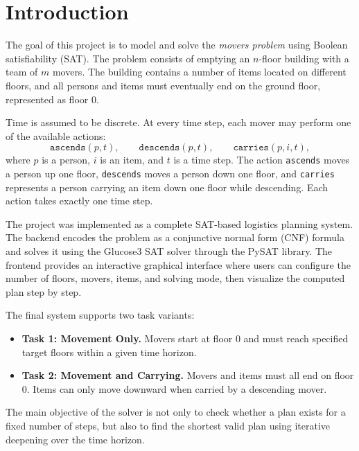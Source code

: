 \section{Introduction} \label{sec:introduction}
The goal of this project is to model and solve the \textit{movers problem} using Boolean satisfiability (SAT).
The problem consists of emptying an $n$-floor building with a team of $m$ movers.
The building contains a number of items located on different floors, and all persons and items must eventually end on the ground floor, represented as floor $0$.

\noindent Time is assumed to be discrete.
At every time step, each mover may perform one of the available actions:
\[
    \texttt{ascends}(p,t), \qquad
    \texttt{descends}(p,t), \qquad
    \texttt{carries}(p,i,t),
\]
where $p$ is a person, $i$ is an item, and $t$ is a time step.
The action \texttt{ascends} moves a person up one floor, \texttt{descends} moves a person down one floor, and \texttt{carries} represents a person carrying an item down one floor while descending.
Each action takes exactly one time step.

\noindent The project was implemented as a complete SAT-based logistics planning system.
The backend encodes the problem as a conjunctive normal form (CNF) formula and solves it using the Glucose3 SAT solver through the PySAT library.
The frontend provides an interactive graphical interface where users can configure the number of floors, movers, items, and solving mode, then visualize the computed plan step by step.

\noindent The final system supports two task variants:

\begin{itemize}
    \item \textbf{Task 1: Movement Only.} Movers start at floor $0$ and must reach specified target floors within a given time horizon.
    \item \textbf{Task 2: Movement and Carrying.} Movers and items must all end on floor $0$.
    Items can only move downward when carried by a descending mover.
\end{itemize}

\noindent The main objective of the solver is not only to check whether a plan exists for a fixed number of steps, but also to find the shortest valid plan using iterative deepening over the time horizon.